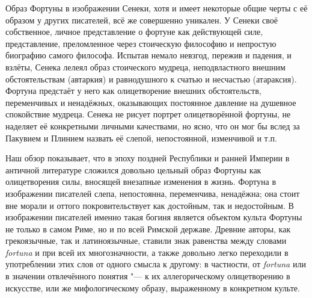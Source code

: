 Образ Фортуны в изображении Сенеки, хотя и имеет некоторые общие черты с её образом у других писателей, всё же совершенно уникален. У Сенеки своё собственное, личное представление о фортуне как действующей силе, представление, преломленное через стоическую философию и непростую биографию самого философа. Испытав немало невзгод, пережив и падения, и взлёты, Сенека лелеял образ стоического мудреца, неподвластного внешним обстоятельствам (автаркия) и равнодушного к счатью и несчастью (атараксия). Фортуна предстаёт у него как олицетворение внешних обстоятельств, переменчивых и ненадёжных, оказывающих постоянное давление на душевное спокойствие мудреца. Сенека не рисует портрет олицетворённой фортуны, не наделяет её конкретными личными качествами, но ясно, что он мог бы вслед за Пакувием и Плинием назвать её слепой, непостоянной, изменчивой и т.п.






Наш обзор показывает, что в эпоху поздней Республики и ранней Империи в античной литературе сложился довольно цельный образ Фортуны как олицетворения силы, вносящей внезапные изменения в жизнь. Фортуна в изображении писателей слепа, непостоянна, переменчива, ненадёжна; она стоит вне морали и оттого покровительствует как достойным, так и недостойным. В изображении писателей именно такая богиня является объектом культа Фортуны не только в самом Риме, но и по всей Римской державе. Древние авторы, как грекоязычные, так и латиноязычные, ставили знак равенства между словами \textit{fortuna} и  при всей их многозначности, а также довольно легко переходили в употреблении этих слов от одного смысла к другому: в частности, от \textit{fortuna} или  в значении отвлечённого понятия "--- к их аллегорическому олицетворению в искусстве, или же мифологическому образу, выраженному в конкретном культе.

